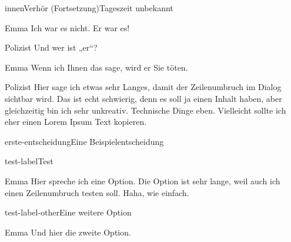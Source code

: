 \documentclass[12pt]{article}
\begin{document}
    \begin{scene}{innen}{Verhör (Fortsetzung)}{Tageszeit unbekannt}
        \begin{dialog}{Emma}
            Ich war es nicht.
            Er war es!
        \end{dialog}

        \begin{dialog}{Polizist}
            Und wer ist „er“?
        \end{dialog}


        \begin{dialog}{Emma}
            Wenn ich Ihnen das sage, wird er Sie töten.
        \end{dialog}

        \begin{dialog}{Polizist}
            Hier sage ich etwas sehr Langes, damit der Zeilenumbruch im Dialog sichtbar wird.
            Das ist echt schwierig, denn es soll ja einen Inhalt haben, aber gleichzeitig bin ich sehr unkreativ.
            Technische Dinge eben.
            Vielleicht sollte ich eher einen Lorem Ipsum Text kopieren.
        \end{dialog}

        \begin{decision}{erste-entscheidung}{Eine Beispielentscheidung}
            \begin{option}{test-label}{Test}
                \begin{dialog}{Emma}
                    Hier spreche ich eine Option.
                    Die Option ist sehr lange, weil auch ich einen Zeilenumbruch testen soll.
                    Haha, wie einfach.
                \end{dialog}
            \end{option}
            \begin{option}{test-label-other}{Eine weitere Option}
                \begin{dialog}{Emma}
                    Und hier die zweite Option.
                \end{dialog}
            \end{option}
        \end{decision}


\end{scene}
\end{document}
